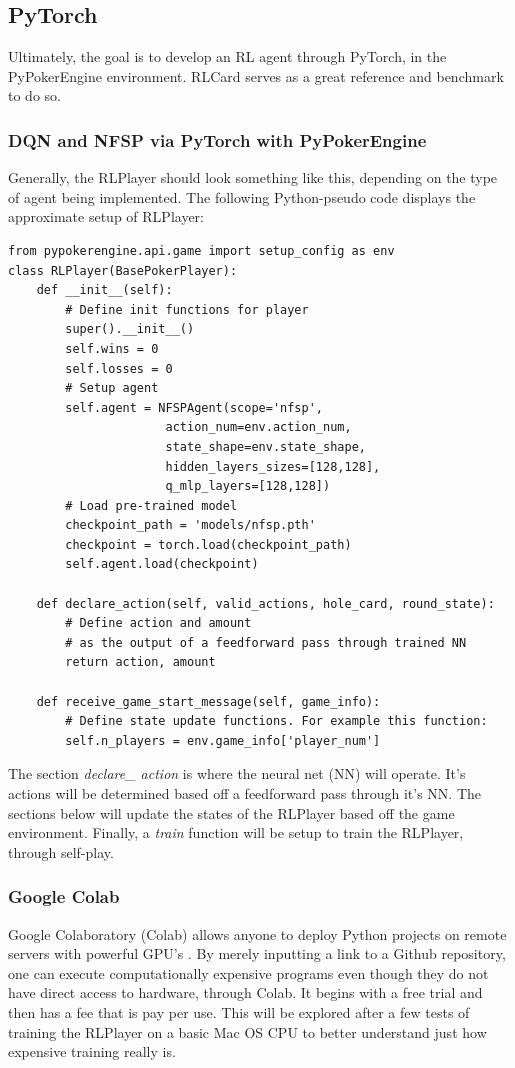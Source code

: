 \documentclass[12pt]{article}
\begin{document}
\subsection{PyTorch}
Ultimately, the goal is to develop an RL agent through PyTorch, in the PyPokerEngine environment. RLCard serves as a great reference and benchmark to do so.
\subsubsection{DQN and NFSP via PyTorch with PyPokerEngine}
Generally, the RLPlayer should look something like this, depending on the type of agent being implemented. The following Python-pseudo code displays the approximate setup of RLPlayer:

\begin{verbatim}
from pypokerengine.api.game import setup_config as env
class RLPlayer(BasePokerPlayer):
    def __init__(self):
        # Define init functions for player
        super().__init__()
        self.wins = 0
        self.losses = 0
        # Setup agent
        self.agent = NFSPAgent(scope='nfsp',
                      action_num=env.action_num,
                      state_shape=env.state_shape,
                      hidden_layers_sizes=[128,128],
                      q_mlp_layers=[128,128])
		# Load pre-trained model
		checkpoint_path = 'models/nfsp.pth'
		checkpoint = torch.load(checkpoint_path)
		self.agent.load(checkpoint)

    def declare_action(self, valid_actions, hole_card, round_state):
        # Define action and amount
        # as the output of a feedforward pass through trained NN
        return action, amount

    def receive_game_start_message(self, game_info):
    	# Define state update functions. For example this function:
        self.n_players = env.game_info['player_num']

\end{verbatim}
The section \textit{declare\_ action} is where the neural net (NN) will operate. It's actions will be determined based off a feedforward pass through it's NN. The sections below will update the states of the RLPlayer based off the game environment. Finally, a \textit{train} function will be setup to train the RLPlayer, through self-play. 
\subsubsection{Google Colab}
Google Colaboratory (Colab) allows anyone to deploy Python projects on remote servers with powerful GPU's \cite{colab}. By merely inputting a link to a Github repository, one can execute computationally expensive programs even though they do not have direct access to hardware, through Colab. It begins with a free trial and then has a fee that is pay per use. This will be explored after a few tests of training the RLPlayer on a basic Mac OS CPU to better understand just how expensive training really is.
\end{document}
